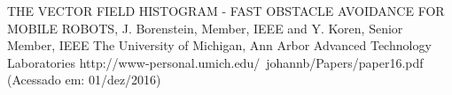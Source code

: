 \renewcommand{\section}[2]{}
\begin{thebibliography}{depth}

 THE VECTOR FIELD HISTOGRAM - FAST OBSTACLE AVOIDANCE FOR MOBILE ROBOTS, J. Borenstein, Member, IEEE and Y. Koren, Senior Member, IEEE The University of Michigan, Ann Arbor Advanced Technology Laboratories  http://www-personal.umich.edu/~johannb/Papers/paper16.pdf (Acessado em: 01/dez/2016)

\end{thebibliography}